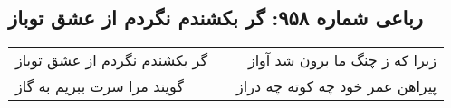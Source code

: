 \begin{center}
\section*{رباعی شماره ۹۵۸: گر بکشندم نگردم از عشق توباز}
\label{sec:0958}
\begin{longtable}{l p{0.5cm} r}
گر بکشندم نگردم از عشق توباز
&&
زیرا که ز چنگ ما برون شد آواز
\\
گویند مرا سرت ببریم به گاز
&&
پیراهن عمر خود چه کوته چه دراز
\\
\end{longtable}
\end{center}
